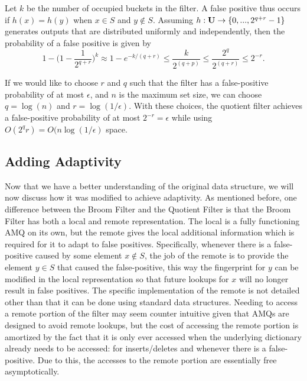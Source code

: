 \documentclass[../paper.tex]{subfiles}
\begin{document}
    Let $k$ be the number of occupied buckets in the filter. A false positive thus occurs if $h(x) =
    h(y)$ when $x \in S$ and $y \notin S$.  Assuming $h: {\bf U} \rightarrow
    \{0, ... , 2^{q+r}-1\}$ generates outputs that are distributed uniformly
    and independently, then the probability of a false positive is given by $$
    1 - \big(1 - \frac{1}{2^{q+r}}\big)^k \approx 1- e^{-k/(q+r)} \leq
    \frac{k}{2^{(q+p)}} \leq \frac{2^q}{2^{(q+r)}} \leq 2^{-r}.$$

    If we would like to choose $r$ and $q$ such that the filter has a false-positive
    probability of at most $\epsilon$, and $n$ is the maximum set size, we can choose $q=\log(n)$
    and $r=\log(1/\epsilon)$.
    With these choices, the quotient filter achieves a false-positive probability of at most
    $2^{-r} = \epsilon$ while using $O(2^q r) = O(n \log (1/\epsilon)$ space.  	

\subsection{Adding Adaptivity} Now that we have a better understanding of the
original data structure, we will now discuss how it was modified to achieve
adaptivity.  As mentioned before, one difference between the Broom Filter and
the Quotient Filter is that the Broom Filter has both a local and remote
representation.  The local is a fully functioning AMQ on its own, but the
remote gives the local additional information which is required for it to adapt
to false positives.  Specifically, whenever there is a false-positive caused by
some element $x \notin S$, the job of the remote is to provide the element $y
\in S$ that caused the false-positive, this way the fingerprint for $y$ can be
modified in the local representation so that future lookups for $x$ will no
longer result in false positives.  The specific implementation of the remote is
not detailed other than that it can be done using standard data structures.
Needing to access a remote portion of the filter may seem counter intuitive
given that AMQs are designed to avoid remote lookups, but the cost of accessing
the remote portion is amortized by the fact that it is only ever accessed when
the underlying dictionary already needs to be accessed: for inserts/deletes and
whenever there is a false-positive.  Due to this, the accesses to the remote
portion are essentially free asymptotically.
	
\end{document}
